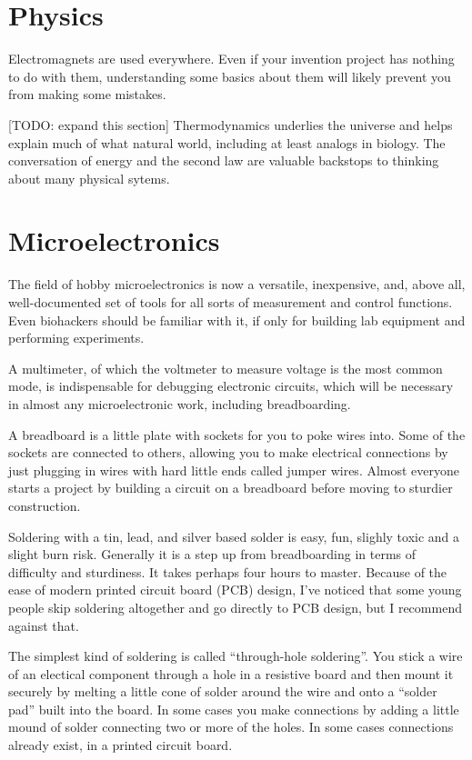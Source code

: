\documentclass[
	fontsize=10pt, %
	twoside=false, %
	secnumdepth=1, %
]{kaobook}
\begin{document}
\section{Physics}

Electromagnets are used everywhere. Even if your invention project has nothing
to do with them, understanding some basics about them will likely prevent
you from making some mistakes.

[TODO: expand this section]
Thermodynamics underlies the universe and helps explain much of what natural
world, including at least analogs in biology. The conversation of energy
and the second law are valuable backstops to thinking about many physical
sytems.

\section{Microelectronics}

The field of hobby microelectronics is now a versatile, inexpensive,
and, above all, well-documented set of tools for all sorts of measurement
and control functions.
Even biohackers should be familiar with it, if only for building
lab equipment and performing experiments.

A multimeter, of which the voltmeter to measure voltage is the most
common mode, is indispensable for debugging electronic circuits,
which will be necessary in almost any microelectronic work,
including breadboarding.

A breadboard is a little plate with sockets for you to poke wires
into. Some of the sockets are connected to others, allowing you to
make electrical connections by just plugging in wires with hard little
ends called jumper wires. Almost everyone starts a project
by building a circuit on a breadboard before moving to sturdier construction.

Soldering with a tin, lead, and silver based solder
is easy, fun, slighly toxic and a slight burn risk.
Generally it is a step up from breadboarding in terms of difficulty and
sturdiness. It takes perhaps four hours to master.
Because of the ease of modern printed circuit board (PCB) design,
I've noticed that some young people skip soldering altogether and
go directly to PCB design, but I recommend against that.

The simplest kind of soldering is called ``through-hole soldering''.
You stick a wire of an electical component through a hole in a
resistive board and then mount it securely by melting a little cone
of solder around the wire and onto a ``solder pad'' built into the
board. In some cases you make connections by adding a little mound
of solder connecting two or more of the holes. In some cases
connections already exist, in a printed circuit board.
\end{document}
